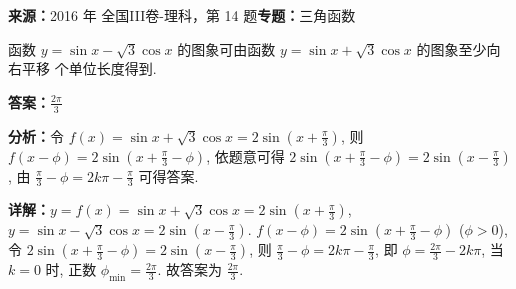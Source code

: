 \begin{question}[points=5]
\textbf{来源：}2016 年 全国III卷-理科，第 14 题\quad \textbf{专题：}三角函数\par
函数 $y=\sin x-\sqrt{3}\cos x$ 的图象可由函数 $y=\sin x+\sqrt{3}\cos x$ 的图象至少向右平移  个单位长度得到.
\fillin[{$\frac{2\pi}{3}$}]
\begin{solution}
\textbf{答案：}$\frac{2\pi}{3}$

\textbf{分析：}令 $f(x)=\sin x+\sqrt{3}\cos x=2\sin(x+\frac{\pi}{3})$, 则 $f(x-\phi)=2\sin(x+\frac{\pi}{3}-\phi)$, 依题意可得 $2\sin(x+\frac{\pi}{3}-\phi)=2\sin(x-\frac{\pi}{3})$, 由 $\frac{\pi}{3}-\phi=2k\pi-\frac{\pi}{3}$ 可得答案.

\textbf{详解：}$y=f(x)=\sin x+\sqrt{3}\cos x=2\sin(x+\frac{\pi}{3})$, $y=\sin x-\sqrt{3}\cos x=2\sin(x-\frac{\pi}{3})$. $f(x-\phi)=2\sin(x+\frac{\pi}{3}-\phi)$ ($\phi>0$), 令 $2\sin(x+\frac{\pi}{3}-\phi)=2\sin(x-\frac{\pi}{3})$, 则 $\frac{\pi}{3}-\phi=2k\pi-\frac{\pi}{3}$, 即 $\phi=\frac{2\pi}{3}-2k\pi$, 当 $k=0$ 时, 正数 $\phi_{\min}=\frac{2\pi}{3}$. 故答案为 $\frac{2\pi}{3}$.
\end{solution}
\end{question}

